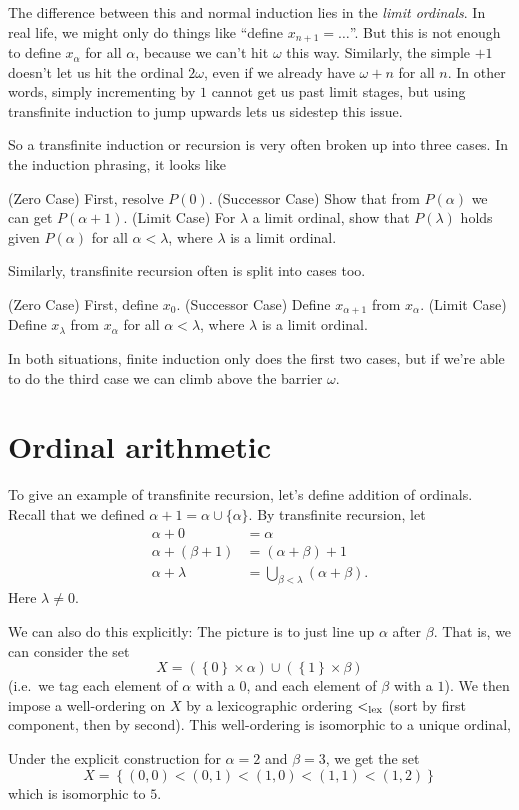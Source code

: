 The difference between this and normal induction lies in the \emph{limit ordinals}.
In real life, we might only do things like ``define $x_{n+1} = \dots$''.
But this is not enough to define $x_\alpha$ for all $\alpha$,
because we can't hit $\omega$ this way.
Similarly, the simple $+1$ doesn't let us hit the ordinal $2\omega$,
even if we already have $\omega+n$ for all $n$.
In other words, simply incrementing by $1$ cannot get us past limit stages,
but using transfinite induction to jump upwards lets us sidestep this issue.

So a transfinite induction or recursion is very often broken up into three cases.
In the induction phrasing, it looks like
\begin{itemize}
	\ii (Zero Case) First, resolve $P(0)$.
	\ii (Successor Case) Show that from $P(\alpha)$ we can get $P(\alpha+1)$.
	\ii (Limit Case) For $\lambda$ a limit ordinal,
	show that $P(\lambda)$ holds given $P(\alpha)$ for all $\alpha < \lambda$,
	where $\lambda$ is a limit ordinal.
\end{itemize}
Similarly, transfinite recursion often is split into cases too.
\begin{itemize}
	\ii (Zero Case) First, define $x_0$.
	\ii (Successor Case) Define $x_{\alpha+1}$ from $x_\alpha$.
	\ii (Limit Case) Define $x_\lambda$ from $x_\alpha$ for all $\alpha < \lambda$,
	where $\lambda$ is a limit ordinal.
\end{itemize}
In both situations, finite induction only does the first two cases,
but if we're able to do the third case we can climb above the barrier $\omega$.

\section{Ordinal arithmetic}
To give an example of transfinite recursion, let's define addition of ordinals.
Recall that we defined $\alpha+1 = \alpha \cup \{\alpha\}$.
By transfinite recursion, let
\begin{align*}
	\alpha + 0 &= \alpha \\
	\alpha + (\beta + 1) &= (\alpha + \beta) + 1 \\
	\alpha + \lambda &= \bigcup_{\beta < \lambda} (\alpha + \beta).
\end{align*}
Here $\lambda \neq 0$.

We can also do this explicitly:
The picture is to just line up $\alpha$ after $\beta$.
That is, we can consider the set
\[
	X = 
	\left( \left\{ 0 \right\} \times \alpha \right)
	\cup
	\left( \left\{ 1 \right\} \times \beta \right)
\]
(i.e.\ we tag each element of $\alpha$ with a $0$, and
each element of $\beta$ with a $1$).
We then impose a well-ordering on $X$ by a lexicographic ordering $<_{\text{lex}}$
(sort by first component, then by second).
This well-ordering is isomorphic to a unique ordinal, 
\begin{example}
	[$2+3=5$]
	Under the explicit construction for $\alpha = 2$ and $\beta = 3$, we get the set
	\[
		X = \left\{ (0,0) < (0,1) < (1,0) < (1,1) < (1,2) \right\}
	\]
	which is isomorphic to $5$.
\end{example}

